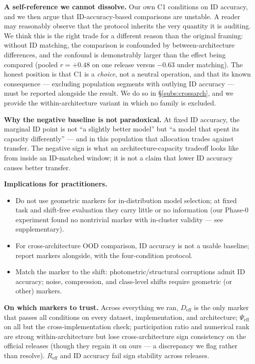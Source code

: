 \documentclass[10pt]{article} %
\newcommand{\srcref}[1]{\S\ref{#1}}
\begin{document}
\textbf{A self-reference we cannot dissolve.} Our own C1 conditions on ID accuracy, and we then argue that ID-accuracy-based comparisons are unstable. A reader may reasonably observe that the protocol inherits the very quantity it is auditing. We think this is the right trade for a different reason than the original framing: without ID matching, the comparison is confounded by between-architecture differences, and the confound is demonstrably larger than the effect being compared (pooled $r=+0.48$ on one release versus $-0.63$ under matching). The honest position is that C1 is a \emph{choice}, not a neutral operation, and that its known consequence --- excluding population segments with outlying ID accuracy --- must be reported alongside the result. We do so in \srcref{subs:crossarch}, and we provide the within-architecture variant in which no family is excluded.

\textbf{Why the negative baseline is not paradoxical.} At fixed ID accuracy, the marginal ID point is not ``a slightly better model'' but ``a model that spent its capacity differently'' --- and in this population that allocation trades against transfer. The negative sign is what an architecture-capacity tradeoff looks like from inside an ID-matched window; it is not a claim that lower ID accuracy causes better transfer.

\textbf{Implications for practitioners.}
\begin{itemize}
\item Do not use geometric markers for in-distribution model selection; at fixed task and shift-free evaluation they carry little or no information (our Phase-0 experiment found no nontrivial marker with in-cluster validity --- see supplementary).
\item For cross-architecture OOD comparison, ID accuracy is not a usable baseline; report markers alongside, with the four-condition protocol.
\item Match the marker to the shift: photometric/structural corruptions admit ID accuracy; noise, compression, and class-level shifts require geometric (or other) markers.
\end{itemize}

\textbf{On which markers to trust.} Across everything we ran, $D_{\mathrm{eff}}$ is the only marker that passes all conditions on every dataset, implementation, and architecture; $\Psi_{\mathrm{eff}}$ on all but the cross-implementation check; participation ratio and numerical rank are strong within-architecture but lose cross-architecture sign consistency on the official releases (though they regain it on ours --- a discrepancy we flag rather than resolve). $R_{\mathrm{eff}}$ and ID accuracy fail sign stability across releases.
\end{document}

